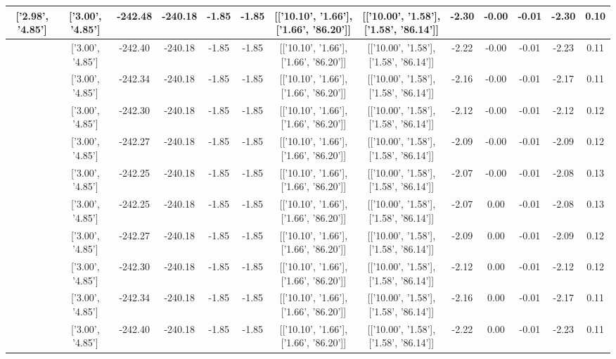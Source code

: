 \begin{table}[htbp]
\begin{adjustbox}{angle=90}
\begin{tabular}{|c|c|c|c|c|c|c|c|c|c|c|c|c|}
 ['2.98', '4.85'] & ['3.00', '4.85'] & -242.48 & -240.18 & -1.85 & -1.85 & [['10.10', '1.66'], ['1.66', '86.20']] & [['10.00', '1.58'], ['1.58', '86.14']] & -2.30 & -0.00 & -0.01 & -2.30 & 0.10\\ \hline
 ['2.98', '4.85'] & ['3.00', '4.85'] & -242.40 & -240.18 & -1.85 & -1.85 & [['10.10', '1.66'], ['1.66', '86.20']] & [['10.00', '1.58'], ['1.58', '86.14']] & -2.22 & -0.00 & -0.01 & -2.23 & 0.11\\ \hline
 ['2.99', '4.85'] & ['3.00', '4.85'] & -242.34 & -240.18 & -1.85 & -1.85 & [['10.10', '1.66'], ['1.66', '86.20']] & [['10.00', '1.58'], ['1.58', '86.14']] & -2.16 & -0.00 & -0.01 & -2.17 & 0.11\\ \hline
 ['2.99', '4.85'] & ['3.00', '4.85'] & -242.30 & -240.18 & -1.85 & -1.85 & [['10.10', '1.66'], ['1.66', '86.20']] & [['10.00', '1.58'], ['1.58', '86.14']] & -2.12 & -0.00 & -0.01 & -2.12 & 0.12\\ \hline
 ['2.99', '4.85'] & ['3.00', '4.85'] & -242.27 & -240.18 & -1.85 & -1.85 & [['10.10', '1.66'], ['1.66', '86.20']] & [['10.00', '1.58'], ['1.58', '86.14']] & -2.09 & -0.00 & -0.01 & -2.09 & 0.12\\ \hline
 ['3.00', '4.85'] & ['3.00', '4.85'] & -242.25 & -240.18 & -1.85 & -1.85 & [['10.10', '1.66'], ['1.66', '86.20']] & [['10.00', '1.58'], ['1.58', '86.14']] & -2.07 & -0.00 & -0.01 & -2.08 & 0.13\\ \hline
 ['3.00', '4.85'] & ['3.00', '4.85'] & -242.25 & -240.18 & -1.85 & -1.85 & [['10.10', '1.66'], ['1.66', '86.20']] & [['10.00', '1.58'], ['1.58', '86.14']] & -2.07 & 0.00 & -0.01 & -2.08 & 0.13\\ \hline
 ['3.01', '4.85'] & ['3.00', '4.85'] & -242.27 & -240.18 & -1.85 & -1.85 & [['10.10', '1.66'], ['1.66', '86.20']] & [['10.00', '1.58'], ['1.58', '86.14']] & -2.09 & 0.00 & -0.01 & -2.09 & 0.12\\ \hline
 ['3.01', '4.85'] & ['3.00', '4.85'] & -242.30 & -240.18 & -1.85 & -1.85 & [['10.10', '1.66'], ['1.66', '86.20']] & [['10.00', '1.58'], ['1.58', '86.14']] & -2.12 & 0.00 & -0.01 & -2.12 & 0.12\\ \hline
 ['3.01', '4.85'] & ['3.00', '4.85'] & -242.34 & -240.18 & -1.85 & -1.85 & [['10.10', '1.66'], ['1.66', '86.20']] & [['10.00', '1.58'], ['1.58', '86.14']] & -2.16 & 0.00 & -0.01 & -2.17 & 0.11\\ \hline
 ['3.02', '4.86'] & ['3.00', '4.85'] & -242.40 & -240.18 & -1.85 & -1.85 & [['10.10', '1.66'], ['1.66', '86.20']] & [['10.00', '1.58'], ['1.58', '86.14']] & -2.22 & 0.00 & -0.01 & -2.23 & 0.11\\ \hline

\end{tabular}
\end{adjustbox}
\end{table}
